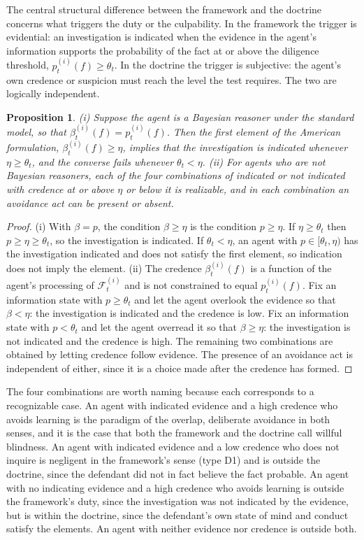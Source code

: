 \documentclass[11pt]{article}
\newcommand{\F}{\mathcal F}
\theoremstyle{plain}
\newtheorem{proposition}{Proposition}
\theoremstyle{definition}
\begin{document}
The central structural difference between the framework and the doctrine concerns what triggers the duty or the culpability. In the framework the trigger is evidential: an investigation is indicated when the evidence in the agent's information supports the probability of the fact at or above the diligence threshold, $p^{(i)}_t(f)\ge\theta_t$. In the doctrine the trigger is subjective: the agent's own credence or suspicion must reach the level the test requires. The two are logically independent.

\begin{proposition}\label{prop:independence}
(i) Suppose the agent is a Bayesian reasoner under the standard model, so that $\beta^{(i)}_t(f)=p^{(i)}_t(f)$. Then the first element of the American formulation, $\beta^{(i)}_t(f)\ge\eta$, implies that the investigation is indicated whenever $\eta\ge\theta_t$, and the converse fails whenever $\theta_t<\eta$. (ii) For agents who are not Bayesian reasoners, each of the four combinations of indicated or not indicated with credence at or above $\eta$ or below it is realizable, and in each combination an avoidance act can be present or absent.
\end{proposition}

\begin{proof}
(i) With $\beta=p$, the condition $\beta\ge\eta$ is the condition $p\ge\eta$. If $\eta\ge\theta_t$ then $p\ge\eta\ge\theta_t$, so the investigation is indicated. If $\theta_t<\eta$, an agent with $p\in[\theta_t,\eta)$ has the investigation indicated and does not satisfy the first element, so indication does not imply the element. (ii) The credence $\beta^{(i)}_t(f)$ is a function of the agent's processing of $\F^{(i)}_t$ and is not constrained to equal $p^{(i)}_t(f)$. Fix an information state with $p\ge\theta_t$ and let the agent overlook the evidence so that $\beta<\eta$: the investigation is indicated and the credence is low. Fix an information state with $p<\theta_t$ and let the agent overread it so that $\beta\ge\eta$: the investigation is not indicated and the credence is high. The remaining two combinations are obtained by letting credence follow evidence. The presence of an avoidance act is independent of either, since it is a choice made after the credence has formed.
\end{proof}

The four combinations are worth naming because each corresponds to a recognizable case. An agent with indicated evidence and a high credence who avoids learning is the paradigm of the overlap, deliberate avoidance in both senses, and it is the case that both the framework and the doctrine call willful blindness. An agent with indicated evidence and a low credence who does not inquire is negligent in the framework's sense (type D1) and is outside the doctrine, since the defendant did not in fact believe the fact probable. An agent with no indicating evidence and a high credence who avoids learning is outside the framework's duty, since the investigation was not indicated by the evidence, but is within the doctrine, since the defendant's own state of mind and conduct satisfy the elements. An agent with neither evidence nor credence is outside both.
\end{document}
